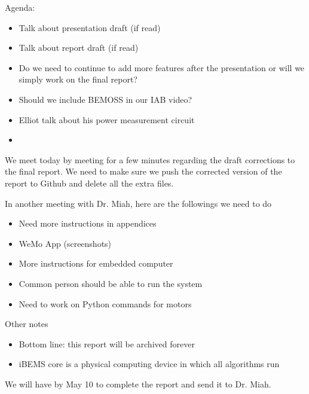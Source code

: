 \documentclass[fontsize=11pt, %
                             paper=letter, %
                             openany, %
                             captions=tableheading,
                             index=totoc,
                             hyperref]{labbook}
\begin{document}
Agenda:
\begin{itemize}
\item Talk about presentation draft (if read)
\item Talk about report draft (if read)
\item Do we need to continue to add more features after the presentation or will we simply work on the final report?
\item Should we include BEMOSS in our IAB video?
\item Elliot talk about his power measurement circuit
\item 
\end{itemize}

We meet today by meeting for a few minutes regarding the draft corrections to the final report. We need to make sure we push the corrected version of the report to Github and delete all the extra files.

In another meeting with Dr. Miah, here are the followings we need to do
\begin{itemize}
\item Need more instructions in appendices
\item WeMo App (screenshots)
\item More instructions for embedded computer
\item Common person should be able to run the system
\item Need to work on Python commands for motors
\end{itemize}
Other notes
\begin{itemize}
\item Bottom line: this report will be archived forever
\item iBEMS core is a physical computing device in which all algorithms run
\end{itemize}
We will have by May 10 to complete the report and send it to Dr. Miah.
\end{document}
